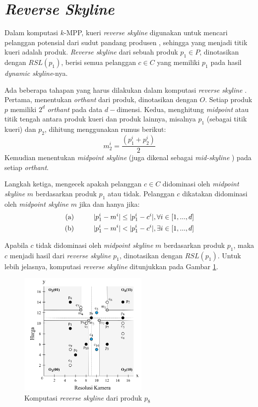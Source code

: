 \section{\textit{Reverse Skyline}}
\tab Dalam komputasi $k$-MPP, kueri \textit{reverse skyline} digunakan untuk mencari pelanggan potensial dari sudut pandang produsen \cite{kmpp}, sehingga yang menjadi titik kueri adalah produk. \textit{Reverse skyline} \cite{reverse-skyline} dari sebuah produk $p_1 \in
P$, dinotasikan dengan $RSL(p_1)$, berisi semua pelanggan $c \in C$ yang memiliki $p_1$ pada hasil \textit{dynamic skyline}-nya.

Ada beberapa tahapan yang harus dilakukan dalam komputasi \textit{reverse skyline} \cite{kmpp}. Pertama, menentukan \textit{orthant} dari produk, dinotasikan dengan $O$. Setiap produk $p$ memiliki $2^d$ \textit{orthant} pada data $d-$dimensi. Kedua, menghitung \textit{midpoint} atau titik tengah antara produk kueri dan produk lainnya, misalnya $p_1$ (sebagai titik kueri) dan $p_2$, dihitung menggunakan rumus berikut: 
\begin{equation} \label{eq:midpoint}
m_2^i = \frac{(p_1^i + p_2^i)}{2}
\end{equation}
Kemudian menentukan \textit{midpoint skyline} (juga dikenal sebagai \textit{mid-skyline} \cite{mid-skyline}) pada setiap \textit{orthant}.

Langkah ketiga, mengecek apakah pelanggan $c \in C$ didominasi oleh \textit{midpoint skyline} $m$ berdasarkan produk $p_1$ atau tidak. Pelanggan $c$ dikatakan didominasi oleh \textit{midpoint skyline} $m$ jika dan hanya jika:
\begin{equation}\label{eq:mid-skyline}
\begin{split}
\text{(a)} \hspace*{1cm} |p_1^i - m^i| \leq |p_1^i - c^i|, \forall i \in [1, ..., d] \\
\text{(b)} \hspace*{1cm} |p_1^i - m^i| < |p_1^i - c^i|, \exists i \in [1, ..., d]
\end{split}
\end{equation}

Apabila $c$ tidak didominasi oleh \textit{midpoint skyline} $m$ berdasarkan produk $p_1$, maka $c$ menjadi hasil dari \textit{reverse skyline} $p_1$, dinotasikan dengan $RSL(p_1)$. Untuk lebih jelasnya, komputasi \textit{reverse skyline} ditunjukkan pada Gambar \ref{fig:rsl}.

\begin{figure}[h]
	\centering
	\includegraphics[height=6cm]{assets/img/bab2/rsl.png}
	\caption{Komputasi \textit{reverse skyline} dari produk $p_8$}
	\label{fig:rsl}
\end{figure}


